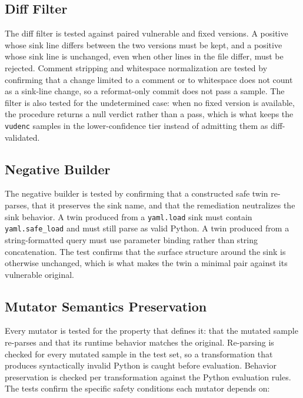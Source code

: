 \subsection{Diff Filter}

The diff filter is tested against paired vulnerable and fixed versions. A
positive whose sink line differs between the two versions must be kept, and a
positive whose sink line is unchanged, even when other lines in the file differ,
must be rejected. Comment stripping and whitespace normalization are tested by
confirming that a change limited to a comment or to whitespace does not count as
a sink-line change, so a reformat-only commit does not pass a sample. The filter
is also tested for the undetermined case: when no fixed version is available, the
procedure returns a null verdict rather than a pass, which is what keeps the
\texttt{vudenc} samples in the lower-confidence tier instead of admitting them as
diff-validated.

\subsection{Negative Builder}

The negative builder is tested by confirming that a constructed safe twin
re-parses, that it preserves the sink name, and that the remediation neutralizes
the sink behavior. A twin produced from a \texttt{yaml.load} sink must contain
\texttt{yaml.safe\_load} and must still parse as valid Python. A twin produced
from a string-formatted query must use parameter binding rather than string
concatenation. The test confirms that the surface structure around the sink is
otherwise unchanged, which is what makes the twin a minimal pair against its
vulnerable original.

\subsection{Mutator Semantics Preservation}

Every mutator is tested for the property that defines it: that the mutated sample
re-parses and that its runtime behavior matches the original. Re-parsing is
checked for every mutated sample in the test set, so a transformation that
produces syntactically invalid Python is caught before evaluation. Behavior
preservation is checked per transformation against the Python evaluation rules.
The tests confirm the specific safety conditions each mutator depends on:

